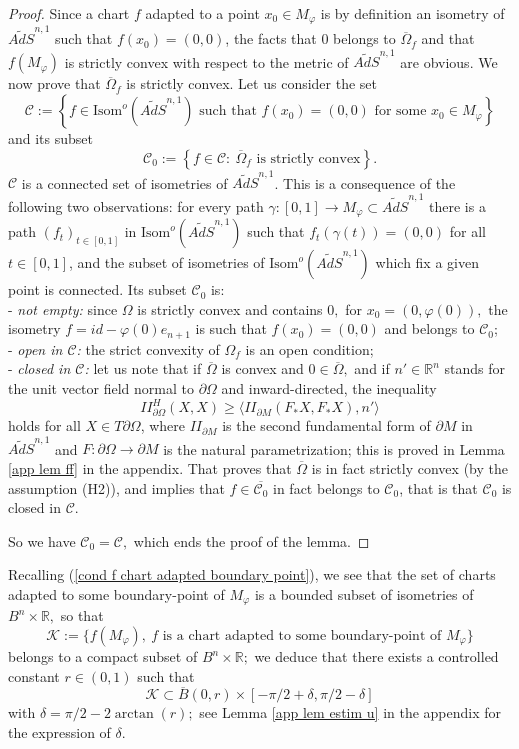 \documentclass[10pt,reqno,oneside]{amsart}
\theoremstyle{definition}
\theoremstyle{remark}
\newcommand{\R}{\mathbb{R}}
\begin{document}
\begin{proof}
Since a chart $f$ adapted to a point $x_0\in M_{\varphi}$ is by definition an isometry of $\widetilde{AdS}^{n,1}$ such that $f(x_0)=(0,0)$, the facts that $0$ belongs to $\overline{\Omega}_f$ and that $f(M_{\varphi})$ is strictly convex with respect to the metric of $\widetilde{AdS}^{n,1}$ are obvious. We now prove that $\overline{\Omega}_f$ is strictly convex. Let us consider the set 
$$\mathcal{C}:=\left\{f\in \mbox{Isom}^o(\widetilde{AdS}^{n,1}) \mbox{ such that }f(x_0)=(0,0)\mbox{ for some }x_0\in M_{\varphi}\right\}$$
and its subset
$$\mathcal{C}_0:=\left\{f\in\mathcal{C}:\ \overline{\Omega}_f \mbox{ is strictly convex}\right\}.$$
$\mathcal{C}$ is a connected set of isometries of $\widetilde{AdS}^{n,1}$. This is a consequence of the following two observations: for every path $\gamma:[0,1]\rightarrow M_{\varphi}\subset\widetilde{AdS}^{n,1}$ there is a path $(f_t)_{t\in[0,1]}$ in $\mbox{Isom}^o(\widetilde{AdS}^{n,1})$ such that $f_t(\gamma(t))=(0,0)$ for all $t\in[0,1]$, and the subset of isometries of $\mbox{Isom}^o(\widetilde{AdS}^{n,1})$ which fix a given point is connected. Its subset $\mathcal{C}_0$ is:
\\- \emph{not empty:} since $\Omega$ is strictly convex and contains $0,$ for $x_0=(0,\varphi(0)),$ the isometry $f=id-\varphi(0)e_{n+1}$ is such that $f(x_0)=(0,0)$ and belongs to $\mathcal{C}_0$; 
\\- \emph{open in $\mathcal{C}$:} the strict convexity of $\Omega_f$ is an open condition; 
\\- \emph{closed in $\mathcal{C}$:} let us note that if $\overline{\Omega}$ is convex and $0\in\overline{\Omega},$ and if $n'\in\R^n$ stands for the unit vector field normal to $\partial\Omega$ and inward-directed, the inequality
$$II_{\partial\Omega}^{H}(X,X)\geq \langle II_{\partial M}(F_*X,F_*X),n'\rangle$$
holds for all $X\in T\partial\Omega$, where $II_{\partial M}$ is the second fundamental form of $\partial M$ in $\widetilde{AdS}^{n,1}$ and $F:\partial\Omega\rightarrow\partial M$ is the natural parametrization; this is proved in Lemma \ref{app lem ff} in the appendix. That proves that $\overline{\Omega}$ is in fact strictly convex (by the assumption (H2)), and implies that $f\in\overline{\mathcal{C}_0}$ in fact belongs to $\mathcal{C}_0$, that is that $\mathcal{C}_0$ is closed in $\mathcal{C}$.

So we have $\mathcal{C}_0=\mathcal{C},$ which ends the proof of the lemma. 
\end{proof}
Recalling (\ref{cond f chart adapted boundary point}), we see that the set of charts adapted to some boundary-point of $M_{\varphi}$ is a bounded subset of isometries of $B^n\times\R,$ so that
$$\mathcal{K}:=\{f(M_{\varphi}),\ f \mbox{ is a chart adapted to some boundary-point of }M_{\varphi}\}$$
belongs to a compact subset of $B^n\times\R;$ we deduce that there exists a controlled constant $r\in (0,1)$ such that 
$$\mathcal{K}\subset \overline{B}(0,r)\times [-\pi/2+\delta,\pi/2-\delta]$$
with $\delta=\pi/2-2\arctan(r);$ see Lemma \ref{app lem estim u} in the appendix for the expression of $\delta$.
\end{document}
